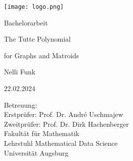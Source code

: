 \documentclass[12pt,a4paper, twoside, autooneside=false]{scrartcl}
\theoremstyle{definition}
\theoremstyle{remark}
\numberwithin{equation}{section}
\begin{document}
     \cfoot{}
     \chead{}
     \ofoot{}
  \begin{titlepage}
  \thispagestyle{empty}
    \texttt{[image: logo.png]} 
    \vspace*{1cm} 

 \begin{center} \large 
    
    Bachelorarbeit
    \vspace*{2cm}

    {\huge The Tutte Polynomial}
    
    \vspace*{0.3cm}
    
    {\Large for Graphs and Matroids}
    
    \vspace*{1.5cm}

    Nelli Funk
    \vspace*{1.5cm}

    22.02.2024
    \vspace*{2cm}


    Betreuung:\\ Erstprüfer: Prof. Dr. André Uschmajew \\ Zweitprüfer: Prof. Dr. Dirk Hachenberger \\[1cm]
    Fakultät für Mathematik \\ 
    Lehrstuhl Mathematical Data Science \\[1cm]
		Universität Augsburg
  \end{center}
\end{titlepage}



\newpage\null\thispagestyle{empty}\newpage
 \tableofcontents
\newpage

   \rehead{\rightmark}
   \lohead{\leftmark}
   \ohead*{\pagemark}
\end{document}
